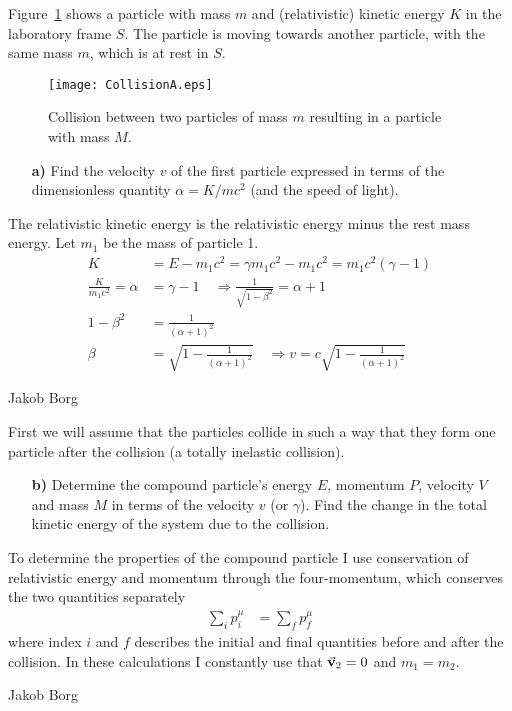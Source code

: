 \documentclass[11pt,a4paper]{report}
\newcounter{excount}[chapter]
\newenvironment{exercise}[1][]{\addtocounter{excount}{1} \noindent {\bf Problem
    \arabic{excount} \ \ #1}\hspace{2mm}}{\vspace{4mm}}
\newenvironment{solution}[1][]
    {\begin{tcolorbox}[title=Solution #1,halign lower=right,breakable]
    }
    {
    \tcblower Jakob Borg
    \end{tcolorbox}
	\vspace{5mm}
    }
\begin{document}
\begin{exercise}
Figure~\ref{fig:collisionA} shows a particle with mass $m$ and (relativistic) kinetic energy $K$ in the laboratory frame $S$. The particle is moving towards another particle, with the same mass $m$, which is at rest in $S$.

\begin{figure}[h]
\begin{center}
\texttt{[image: CollisionA.eps]}
\end{center}
\caption{Collision between two particles of mass $m$ resulting in a particle with mass $M$.}
\label{fig:collisionA}
\end{figure}

\begin{itemize}
\item[\bf a)] Find the velocity $v$ of the first particle expressed in terms of the dimensionless quantity $\alpha=K/mc^2$ (and the speed of light).
\end{itemize}
\begin{solution}[\bf 2.a]
The relativistic kinetic energy is the relativistic energy minus the rest mass energy. Let $m_1$ be the mass of particle 1.
\begin{align*}
K &= E - m_1c^2 = \gamma m_1c^2 - m_1 c^2 = m_1c^2(\gamma-1)
\\
\frac{K}{m_1c^2} = \alpha &= \gamma -1 \quad \Rightarrow \frac{1}{\sqrt{1-\beta^2}} = \alpha+1
\\
1-\beta^2 &= \frac{1}{(\alpha+1)^2}
\\
\beta &= \sqrt{1-\frac{1}{(\alpha+1)^2}} \quad \Rightarrow v = c\sqrt{1-\frac{1}{(\alpha+1)^2}}
\end{align*}
\end{solution}

First we will assume that the particles collide in  such a way that they form one particle after the collision (a totally inelastic collision).
\begin{itemize}
\item[\bf b)] Determine the compound particle's energy $E$, momentum $P$, velocity $V$ and mass $M$ in terms of the velocity $v$ (or $\gamma$). Find the change in the total kinetic energy of the system due to the collision.
\end{itemize}
\begin{solution}[\bf 2.b]
To determine the properties of the compound particle I use conservation of relativistic energy and momentum through the four-momentum, which conserves the two quantities separately
\begin{align*}
\sum_i p_i^\mu &= \sum_f p_f^\mu
\end{align*}
where index $i$ and $f$ describes the initial and final quantities before and after the collision. In these calculations I constantly use that $\va{v}_2 = 0$ and $m_1 = m_2$.


\end{solution}
\end{exercise}
\end{document}
